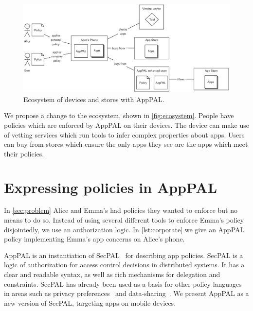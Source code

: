 \documentclass[]{scrartcl}
\begin{document}
\begin{figure}
\includegraphics{figures/overview.eps}
\caption{Ecosystem of devices and stores with AppPAL.}
\label{fig:ecosystem}
\end{figure}

We propose a change to the ecosystem, shown in \autoref{fig:ecosystem}.
People have policies which are enforced by AppPAL on their devices.
The device can make use of vetting services which run tools to infer complex properties about apps.
Users can buy from stores which ensure the only apps they see are the apps which meet their policies.

\section{Expressing policies in AppPAL}
\label{sec:idea}

In \autoref{sec:problem} Alice and Emma's had policies they wanted to enforce but no means to do so.
Instead of using several different tools to enforce Emma's policy disjointedly, we use an authorization logic.
In \autoref{lst:corporate} we give an AppPAL policy implementing Emma's app concerns on Alice's phone.


AppPAL is an instantiation of SecPAL~\citep{Becker:2006vh} for describing app policies.
SecPAL is a logic of authorization for access control decisions in distributed systems.
It has a clear and readable syntax, as well as rich mechanisms for delegation and constraints.
SecPAL has already been used as a basis for other policy languages in areas such as privacy preferences~\citep{Becker:2009ula} and data-sharing~\citep{Aziz:2011vt}.
We present AppPAL as a new version of SecPAL, targeting apps on mobile devices.
\end{document}
